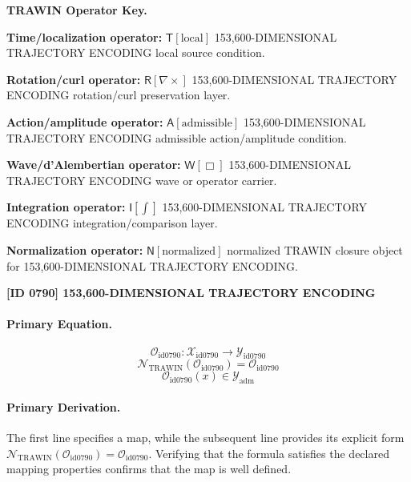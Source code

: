 \par\vspace{0.45\baselineskip}
\noindent\begin{minipage}[t]{\linewidth}
\begingroup
\small
\raggedright
\textbf{TRAWIN Operator Key.}\par
\noindent\textbf{Time/localization operator:} $\mathsf{T}\!\left[\mathrm{local}\right]$ 153,600-DIMENSIONAL TRAJECTORY ENCODING local source condition.\par
\noindent\textbf{Rotation/curl operator:} $\mathsf{R}\!\left[\nabla\times\right]$ 153,600-DIMENSIONAL TRAJECTORY ENCODING rotation/curl preservation layer.\par
\noindent\textbf{Action/amplitude operator:} $\mathsf{A}\!\left[\mathrm{admissible}\right]$ 153,600-DIMENSIONAL TRAJECTORY ENCODING admissible action/amplitude condition.\par
\noindent\textbf{Wave/d'Alembertian operator:} $\mathsf{W}\!\left[\Box\right]$ 153,600-DIMENSIONAL TRAJECTORY ENCODING wave or operator carrier.\par
\noindent\textbf{Integration operator:} $\mathsf{I}\!\left[\int\right]$ 153,600-DIMENSIONAL TRAJECTORY ENCODING integration/comparison layer.\par
\noindent\textbf{Normalization operator:} $\mathsf{N}\!\left[\mathrm{normalized}\right]$ normalized TRAWIN closure object for 153,600-DIMENSIONAL TRAJECTORY ENCODING.\par
\endgroup
\end{minipage}

\clearpage
\noindent\textbf{[ID 0790] 153,600-DIMENSIONAL TRAJECTORY ENCODING}\par
\vspace{0.35em}
\paragraph{Primary Equation.}
\[
\mathcal{O}_{\mathrm{id0790}}:\mathcal{X}_{\mathrm{id0790}}\longrightarrow\mathcal{Y}_{\mathrm{id0790}}
\]
\[
\mathcal{N}_{\mathrm{TRAWIN}}(\mathcal{O}_{\mathrm{id0790}})=\mathcal{O}_{\mathrm{id0790}}
\]
\[
\mathcal{O}_{\mathrm{id0790}}(x)\in\mathcal{Y}_{\mathrm{adm}}
\]

\paragraph{Primary Derivation.}
The first line specifies a map, while the subsequent line provides its explicit form \( \mathcal{N}_{\mathrm{TRAWIN}}(\mathcal{O}_{\mathrm{id0790}})=\mathcal{O}_{\mathrm{id0790}} \). Verifying that the formula satisfies the declared mapping properties confirms that the map is well defined.
